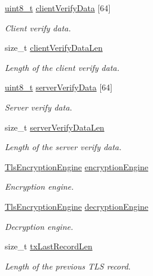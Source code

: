 \begin{DoxyCompactItemize}
\hyperlink{stdint_8h_aba7bc1797add20fe3efdf37ced1182c5}{uint8\+\_\+t} \hyperlink{struct__TlsContext_a35d51a09aa82c6b17d560f6b45fef6a2}{client\+Verify\+Data} \mbox{[}64\mbox{]}
\begin{DoxyCompactList}\small\item\em Client verify data. \end{DoxyCompactList}\item 
size\+\_\+t \hyperlink{struct__TlsContext_a008d5effdf62dbbc147c872022c9fe72}{client\+Verify\+Data\+Len}
\begin{DoxyCompactList}\small\item\em Length of the client verify data. \end{DoxyCompactList}\item 
\hyperlink{stdint_8h_aba7bc1797add20fe3efdf37ced1182c5}{uint8\+\_\+t} \hyperlink{struct__TlsContext_afa01855dd493cebbf4fa96e74bd5b343}{server\+Verify\+Data} \mbox{[}64\mbox{]}
\begin{DoxyCompactList}\small\item\em Server verify data. \end{DoxyCompactList}\item 
size\+\_\+t \hyperlink{struct__TlsContext_ae0e1a4d25bf7c88c2548c40c8247b7eb}{server\+Verify\+Data\+Len}
\begin{DoxyCompactList}\small\item\em Length of the server verify data. \end{DoxyCompactList}\item 
\hyperlink{structTlsEncryptionEngine}{Tls\+Encryption\+Engine} \hyperlink{struct__TlsContext_af88a47a7dbd14e4ca3abd6486b4eaf7d}{encryption\+Engine}
\begin{DoxyCompactList}\small\item\em Encryption engine. \end{DoxyCompactList}\item 
\hyperlink{structTlsEncryptionEngine}{Tls\+Encryption\+Engine} \hyperlink{struct__TlsContext_ad61f179ec1cbeb1543aee9487b63e7c4}{decryption\+Engine}
\begin{DoxyCompactList}\small\item\em Decryption engine. \end{DoxyCompactList}\item 
size\+\_\+t \hyperlink{struct__TlsContext_ab117e95d9f1251cfc14f9ca4324a054d}{tx\+Last\+Record\+Len}
\begin{DoxyCompactList}\small\item\em Length of the previous T\+LS record. \end{DoxyCompactList}\item 

\end{DoxyCompactItemize}
